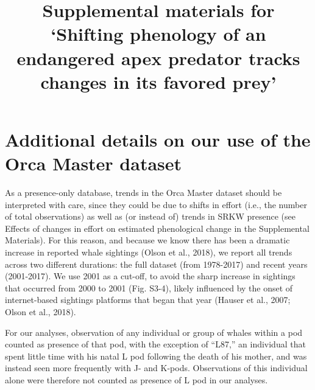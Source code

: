 \documentclass{article}
\begin{document}



\title{Supplemental materials for `Shifting phenology of an endangered apex predator tracks changes in its favored prey'}
\date{ }
\maketitle
\author{}
\renewcommand{\thetable}{S\arabic{table}}
\renewcommand{\thefigure}{S\arabic{figure}}
\section*{Additional details on our use of the Orca Master dataset}

As a presence-only database, trends in the Orca Master dataset should be interpreted with care, since they could be due to shifts in effort (i.e., the number of total observations) as well as (or instead of) trends in SRKW presence (see Effects of changes in effort on estimated phenological change in the Supplemental Materials). For this reason, and because we know there has been a dramatic increase in reported whale sightings (Olson et al., 2018), we report all trends across two different durations: the full dataset (from 1978-2017) and recent years (2001-2017). We use 2001 as a cut-off, to avoid the sharp increase in sightings that occurred from 2000 to 2001 (Fig. S3-4), likely influenced by the onset of internet-based sightings platforms that began that year (Hauser et al., 2007; Olson et al., 2018).

For our analyses, observation of any individual or group of whales within a pod counted as presence of that pod, with the exception of ``L87,'' an individual that spent little time with his natal L pod following the death of his mother, and was instead seen more frequently with J- and K-pods. Observations of this individual alone were therefore not counted as presence of L pod in our analyses.
 
\end{document}
